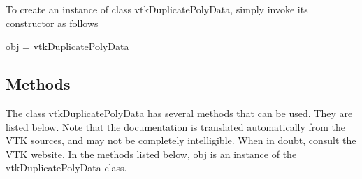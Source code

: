 To create an instance of class vtk\-Duplicate\-Poly\-Data, simply invoke its constructor as follows \begin{DoxyVerb}  obj = vtkDuplicatePolyData
\end{DoxyVerb}
 \hypertarget{vtkwidgets_vtkxyplotwidget_Methods}{}\subsection{Methods}\label{vtkwidgets_vtkxyplotwidget_Methods}
The class vtk\-Duplicate\-Poly\-Data has several methods that can be used. They are listed below. Note that the documentation is translated automatically from the V\-T\-K sources, and may not be completely intelligible. When in doubt, consult the V\-T\-K website. In the methods listed below, {\ttfamily obj} is an instance of the vtk\-Duplicate\-Poly\-Data class. 
